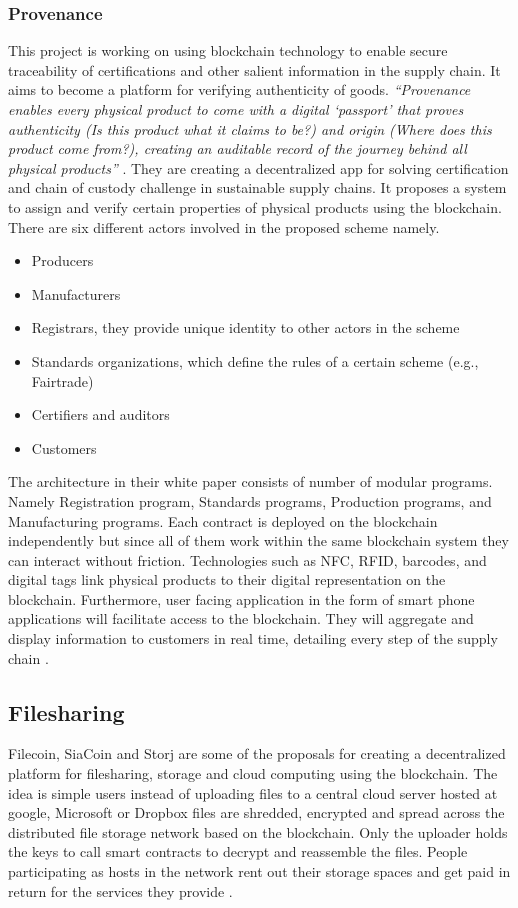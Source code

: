 \subsubsection{Provenance}
This project is working on using blockchain technology to enable secure traceability of certifications and other salient information in the supply chain. It aims to become a platform for verifying authenticity of goods. \textit{“Provenance enables every physical product to come with a digital ‘passport’ that proves authenticity (Is this product what it claims to be?) and origin (Where does this product come from?), creating an auditable record of the journey behind all physical products”} \cite{paper:006}. They are creating a decentralized app for solving certification and chain of custody challenge in sustainable supply chains. It proposes a system to assign and verify certain properties of physical products using the blockchain. There are six different actors involved in the proposed scheme namely.
\begin{itemize}
\item Producers 
\item Manufacturers
\item Registrars, they provide unique identity to other actors in the scheme 
\item Standards organizations, which define the rules of a certain scheme (e.g., Fairtrade) 
\item Certifiers and auditors 
\item Customers
 
\end{itemize}
The architecture in their white paper \cite{paper:006} consists of number of modular programs. Namely Registration program, Standards programs, Production programs, and Manufacturing programs. Each contract is deployed on the blockchain independently but since all of them work within the same blockchain system they can interact without friction. Technologies such as NFC, RFID, barcodes, and digital tags link physical products to their digital representation on the blockchain. Furthermore, user facing application in the form of smart phone applications will facilitate access to the blockchain. They will aggregate and display information to customers in real time, detailing every step of the supply chain \cite{paper:006}.

\subsection{Filesharing}
Filecoin, SiaCoin and Storj are some of the proposals for creating a decentralized platform for filesharing, storage and cloud computing using the blockchain. The idea is simple users instead of uploading files to a central cloud server hosted at google, Microsoft or Dropbox files are shredded, encrypted and spread across the distributed file storage network based on the blockchain. Only the uploader holds the keys to call smart contracts to decrypt and reassemble the files. People participating as hosts in the network rent out their storage spaces and get paid in return for the services they provide \cite{misc:016}.
